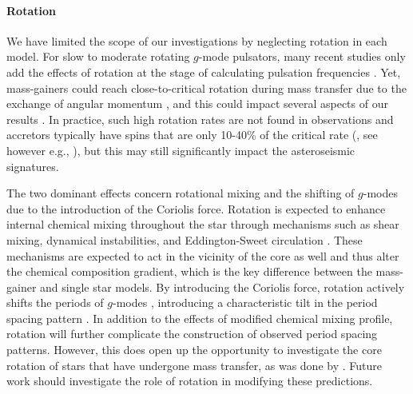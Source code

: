 \documentclass[desactivate]{aa}
\begin{document}


\paragraph{Rotation} We have limited the scope of our investigations by neglecting rotation in each model. For slow to moderate rotating $g$-mode pulsators, many recent studies only add the effects of rotation at the stage of calculating pulsation frequencies \citep[e.g.][]{Michielsen+2021}. Yet, mass-gainers could reach close-to-critical rotation during mass transfer due to the exchange of angular momentum \citep{Packet+1981, deMink+2013:2013ApJ...764..166D, Renzo+2021}, and this could impact several aspects of our results \citep[e.g.][and references therein]{Aerts+2023:2023arXiv231108453A}. In practice, such high rotation rates are not found in observations and accretors typically have spins that are only 10-40\% of the critical rate (\citealp{Dervisoglu+2010}, see however e.g., \citealp{Zehe+2018:2018AN....339...46Z}), but this may still significantly impact the asteroseismic signatures.

The two dominant effects concern rotational mixing and the shifting of $g$-modes due to the introduction of the Coriolis force. Rotation is expected to enhance internal chemical mixing throughout the star through mechanisms such as shear mixing, dynamical instabilities, and Eddington-Sweet circulation \citep{Maeder2000}. These mechanisms are expected to act in the vicinity of the core as well and thus alter the chemical composition gradient, which is the key difference between the mass-gainer and single star models. By introducing the Coriolis force, rotation actively shifts the periods of $g$-modes \citep{Townsend2003}, introducing a characteristic tilt in the period spacing pattern \citep{Bouabid+2013}. In addition to the effects of modified chemical mixing profile, rotation will further complicate the construction of observed period spacing patterns. However, this does open up the opportunity to investigate the core rotation of stars that have undergone mass transfer, as was done by \citet{Guo2019}. Future work should investigate the role of rotation in modifying these predictions.
\end{document}
